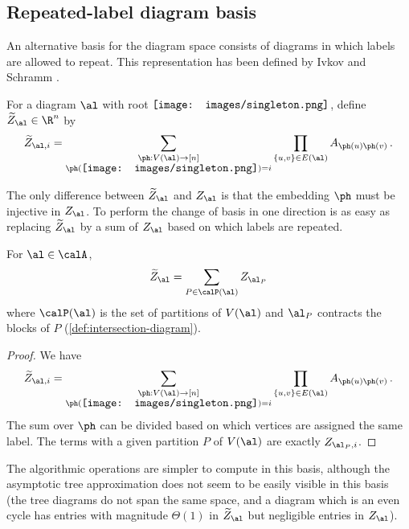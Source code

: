 \documentclass[12pt]{article}
\newcommand{\rootpic}{\vcenter{\hbox{\texttt{[image: images/singleton.png]}}}}
\newcommand{\smallrootpic}{\vcenter{\hbox{\texttt{[image: images/singleton.png]}}}}
\begin{document}
\subsection{Repeated-label diagram basis}
\label{sec:repeated-labels}

An alternative basis for the diagram space consists of diagrams
in which labels are allowed to repeat.
This representation has been defined by Ivkov and Schramm \cite[Section 3.5]{ivkov2023semidefinite}.

\begin{definition}[$\widetilde{Z}_\al$]
For a diagram $\al$ with
root $\rootpic$, define $\widetilde{Z}_\al \in \R^n$ by
\[\widetilde{Z}_{\al,i} = \sum_{\substack{\ph: V(\al) \to [n]\\\ph(\smallrootpic) = i}} \prod_{\{u,v\} \in E(\al)} A_{\ph(u)\ph(v)}\,.\]
\end{definition}


The only difference between $\widetilde{Z}_\al$ and $Z_\al$ is that the embedding
$\ph$ must be injective in $Z_\al$.
To perform the change of 
basis in one direction is as easy as replacing $\widetilde{Z}_\al$
by a sum of $Z_\al$
based on which labels are repeated.


\begin{lemma}\label{lem:change-basis}
    For $\al \in \calA$,
    \[\widetilde{Z}_\al = \sum_{P \in \calP(\al)} Z_{\al_P}\]
    where $\calP(\al)$ is the set of partitions of $V(\al)$ and $\al_P$
    contracts the blocks of $P$ (\cref{def:intersection-diagram}).
\end{lemma}
\begin{proof}
    We have
    \[\widetilde{Z}_{\al,i} = \sum_{\substack{\ph: V(\al) \to [n]\\\ph(\smallrootpic) = i}} \prod_{\{u,v\} \in E(\al)} A_{\ph(u)\ph(v)}\,.\]
    The sum over $\ph$ can be divided based on which vertices are assigned the same label.
    The terms with a given partition $P$ of $V(\al)$ are exactly $Z_{\al_P, i}$.
\end{proof}

The algorithmic operations are simpler to compute in this basis,
although the asymptotic tree approximation does not seem to be easily visible
in this basis
(the tree diagrams do not span the same space, and a diagram which is an even cycle has entries with magnitude $\Theta(1)$ in $\widetilde{Z}_\al$ but negligible entries in $Z_\al$).
\end{document}
